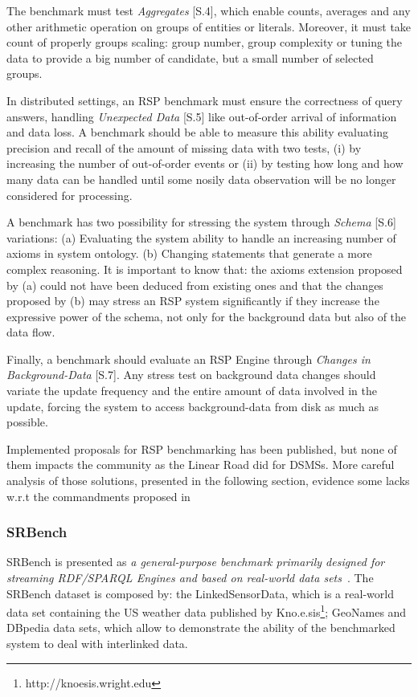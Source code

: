 The benchmark must test \textit{Aggregates} [S.4], which enable counts, averages and any other arithmetic operation on groups of entities or literals. Moreover, it must take count of properly groups scaling: group number, group complexity or tuning the data to provide a big number of candidate, but a small number of selected groups.

In distributed settings, an RSP benchmark must ensure the correctness of query answers, handling \textit{Unexpected Data} [S.5] like out-of-order arrival of information and data loss. A benchmark should be able to measure this ability evaluating precision and recall of the amount of missing data with two tests, (i) by increasing the number of out-of-order events or (ii) by testing how long and how many data can be handled until some nosily data observation will be no longer considered for processing.

A benchmark has two possibility for stressing the system through \textit{Schema} [S.6] variations: (a) Evaluating the system ability to handle an increasing number of axioms in system ontology. (b) Changing statements that generate a more complex reasoning. It is important to know that: the axioms extension proposed by (a) could not have been deduced from existing ones and that the changes proposed by (b) may stress an RSP system significantly if they increase the expressive power of the schema, not only for the background data but also of the data flow.

Finally, a benchmark should evaluate an RSP Engine through \textit{Changes in Background-Data} [S.7]. Any stress test on background data changes should variate the update frequency and the entire amount of data involved in the update, forcing the system to access background-data from disk as much as possible.

Implemented proposals for RSP benchmarking has been published, but none of them impacts the community as the Linear Road did for DSMSs. More careful analysis of those solutions, presented in the following section, evidence some lacks w.r.t the commandments proposed in~\cite{DBLP:conf/esws/ScharrenbachUMVB13} 

\subsubsection{SRBench}\label{sec:srbench}

SRBench is presented as \textit{a general-purpose benchmark primarily designed for streaming RDF/SPARQL Engines and based on real-world data sets}~\cite{Zhang2012}. The SRBench dataset is composed by: the LinkedSensorData, which  is a real-world data set containing the US weather data published by Kno.e.sis\footnote{ http://knoesis.wright.edu};  GeoNames and DBpedia data sets, which allow to demonstrate the ability of the benchmarked system to deal with interlinked data.

